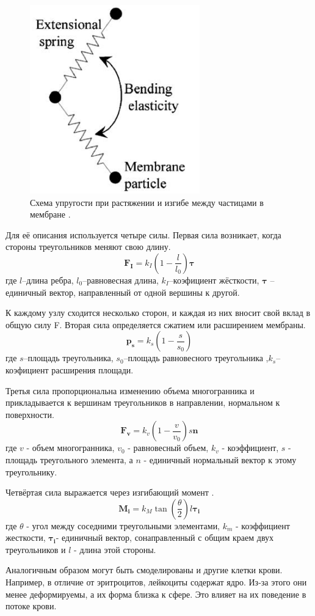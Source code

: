 \begin{figure}[h]
\centering
\includegraphics[width=0.3\linewidth]{mol3.png}
\caption{ Схема упругости при растяжении и изгибе между частицами в мембране \cite{hosseini:2009}.}
\label{fig:mpr}
\end{figure}

Для её описания используется четыре силы.
Первая сила возникает, когда стороны треугольников меняют свою длину.
$$
\mathbf {F_I}=k_I\left(1- \frac{l}{l_0}\right) \mathbf {\tau}
$$
где $l$--длина ребра, $l_0$--равновесная длина, $k_I$--коэфициент жёсткости, $\mathbf { \tau}$ --единичный вектор, направленный от одной вершины к другой.

К каждому узлу сходится несколько сторон, и каждая из них вносит свой вклад в общую силу F. Вторая сила определяется сжатием или расширением мембраны.  
$$
\mathbf {p_s}=k_s\left(1- \frac{s}{s_0}\right)
$$
где $s$--площадь треугольника, $s_0$--площадь равновесного треугольника ,$k_s$--коэфициент расширения площади.

Третья сила пропорциональна изменению объема многогранника и прикладывается к вершинам треугольников в направлении, нормальном к поверхности. 
$$
\mathbf {F_v}=k_v\left(1- \frac{v}{v_0}\right) s \mathbf{n}
$$
где $v$ - объем многогранника, $v_0$ - равновесный объем, $k_v$ - коэффициент, $s$ - площадь
треугольного элемента, а $n$ - единичный нормальный вектор к этому треугольнику.

Четвёртая сила выражается через изгибающий момент \cite{hosseini:2009}.
$$
\mathbf {M_i}=k_M \tan\left(\frac{\theta}{2}\right)l \mathbf{\tau_i}
$$
где $\theta$ - угол между соседними треугольными элементами, $k_m$ - коэффициент жесткости, $\mathbf{\tau_i}$- единичный вектор, сонаправленный с общим краем двух треугольников и $l$ - длина этой стороны.

Аналогичным образом могут быть смоделированы и другие клетки крови. Например, в отличие от эритроцитов, лейкоциты содержат ядро. Из-за этого они менее деформируемы, а их форма близка к сфере. Это влияет на их поведение в потоке крови.

